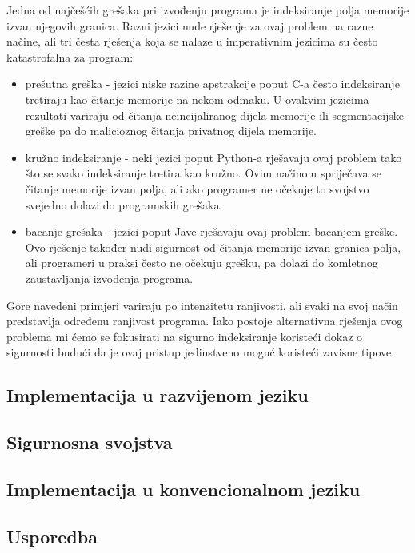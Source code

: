 \documentclass[diplomskirad,upload]{fer}
\begin{document}
Jedna od najčešćih grešaka pri izvođenju programa je indeksiranje polja memorije
izvan njegovih granica. Razni jezici nude rješenje za ovaj problem na razne
načine, ali tri česta rješenja koja se nalaze u imperativnim jezicima su
često katastrofalna za program:
\begin{itemize}
    \item prešutna greška - jezici niske razine apstrakcije poput C-a često
        indeksiranje tretiraju kao čitanje memorije na nekom odmaku. U ovakvim
        jezicima rezultati variraju od čitanja neincijaliranog dijela memorije
        ili segmentacijske greške pa do malicioznog čitanja privatnog dijela
        memorije.
    \item kružno indeksiranje - neki jezici poput Python-a rješavaju ovaj
        problem tako što se svako indeksiranje tretira kao kružno. Ovim načinom
        spriječava se čitanje memorije izvan polja, ali ako programer ne očekuje
        to svojstvo svejedno dolazi do programskih grešaka.
    \item bacanje grešaka - jezici poput Jave rješavaju ovaj problem bacanjem
        greške. Ovo rješenje također nudi sigurnost od čitanja memorije izvan
        granica polja, ali programeri u praksi često ne očekuju grešku, pa
        dolazi do komletnog zaustavljanja izvođenja programa.
\end{itemize}
Gore navedeni primjeri variraju po intenzitetu ranjivosti, ali svaki na svoj
način predstavlja određenu ranjivost programa. Iako postoje alternativna
rješenja ovog problema mi ćemo se fokusirati na sigurno indeksiranje koristeći
dokaz o sigurnosti budući da je ovaj pristup jedinstveno moguć koristeći zavisne
tipove.

\subsection{Implementacija u razvijenom jeziku}

\subsection{Sigurnosna svojstva}

\subsection{Implementacija u konvencionalnom jeziku}

\subsection{Usporedba}
\end{document}
